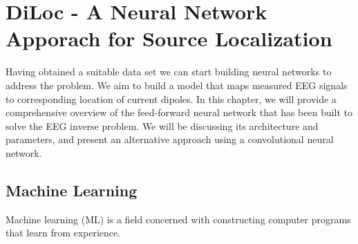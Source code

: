 \documentclass[a4paper, UKenglish, 11pt]{uiomaster}
\begin{document}
\chapter{DiLoc - A Neural Network Apporach for Source Localization}
Having obtained a suitable data set we can start building neural networks to address the problem. We aim to build a model that maps measured EEG signals to corresponding location of current dipoles. In this chapter, we will provide a comprehensive overview of the feed-forward neural network that has been built to solve the EEG inverse problem. We will be discussing its architecture and parameters, and present an alternative approach using a convolutional neural network.



\section{Machine Learning}
Machine learning (ML) is a field concerned with constructing computer programs that learn from experience. 

\end{document}
